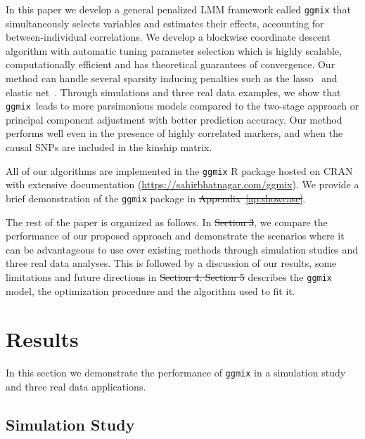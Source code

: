 \documentclass[10pt,letterpaper]{article}
\newcommand{\ggmix}{\texttt{ggmix}}
\providecommand{\DIFaddtex}[1]{{\protect\color{blue}\uwave{#1}}} %
\providecommand{\DIFdeltex}[1]{{\protect\color{red}\sout{#1}}}                      %
\providecommand{\DIFaddbegin}{} %
\providecommand{\DIFaddend}{} %
\providecommand{\DIFdelbegin}{} %
\providecommand{\DIFdelend}{} %
\providecommand{\DIFadd}[1]{\texorpdfstring{\DIFaddtex{#1}}{#1}} %
\providecommand{\DIFdel}[1]{\texorpdfstring{\DIFdeltex{#1}}{}} %
\newcommand{\DIFscaledelfig}{0.5}
\newlength{\DIFdelgraphicswidth} %
\newlength{\DIFdelgraphicsheight} %
\newcommand{\DIFaddincludegraphics}[2][]{{\color{blue}\fbox{\DIFOincludegraphics[#1]{#2}}}} %
\newcommand{\DIFdelincludegraphics}[2][]{%
\sbox{\DIFdelgraphicsbox}{\DIFOincludegraphics[#1]{#2}}%
\settoboxwidth{\DIFdelgraphicswidth}{\DIFdelgraphicsbox} %
\settoboxtotalheight{\DIFdelgraphicsheight}{\DIFdelgraphicsbox} %
\scalebox{\DIFscaledelfig}{%
\parbox[b]{\DIFdelgraphicswidth}{\usebox{\DIFdelgraphicsbox}\\[-\baselineskip] \rule{\DIFdelgraphicswidth}{0em}}\llap{\resizebox{\DIFdelgraphicswidth}{\DIFdelgraphicsheight}{%
\setlength{\unitlength}{\DIFdelgraphicswidth}%
\begin{picture}(1,1)%
\thicklines\linethickness{2pt} %
{\color[rgb]{1,0,0}\put(0,0){\framebox(1,1){}}}%
{\color[rgb]{1,0,0}\put(0,0){\line( 1,1){1}}}%
{\color[rgb]{1,0,0}\put(0,1){\line(1,-1){1}}}%
\end{picture}%
}\hspace*{3pt}}} %
} %
\DeclareRobustCommand{\DIFaddbegin}{\DIFOaddbegin \let\includegraphics\DIFaddincludegraphics} %
\DeclareRobustCommand{\DIFaddend}{\DIFOaddend \let\includegraphics\DIFOincludegraphics} %
\DeclareRobustCommand{\DIFdelbegin}{\DIFOdelbegin \let\includegraphics\DIFdelincludegraphics} %
\DeclareRobustCommand{\DIFdelend}{\DIFOaddend \let\includegraphics\DIFOincludegraphics} %
\begin{document}
In this paper we develop a general penalized LMM framework called \texttt{ggmix} that simultaneously selects variables and estimates their effects, accounting for between-individual correlations. We develop a blockwise coordinate descent algorithm with automatic tuning parameter selection which is highly scalable, computationally efficient and has theoretical guarantees of convergence. Our method can handle several sparsity inducing penalties such as the lasso~\cite{tibshirani1996regression} and elastic net~\cite{zou2005regularization}. Through simulations and three real data examples, we show that \ggmix ~leads to more parsimonious models compared to the two-stage approach or principal component adjustment with better prediction accuracy. Our method performs well even in the presence of highly correlated markers, and when the causal SNPs are included in the kinship matrix. 

All of our algorithms are implemented in the \texttt{ggmix} R package hosted on CRAN with extensive documentation (\url{https://sahirbhatnagar.com/ggmix}). We provide a brief demonstration of the \texttt{ggmix} package in \DIFdelbegin \DIFdel{Appendix~\ref{ap:showcase}}\DIFdelend \DIFaddbegin {}\DIFaddend .

The rest of the paper is organized as follows. In \DIFdelbegin \DIFdel{Section 3}\DIFdelend \DIFaddbegin {}\DIFaddend , we compare the performance of our proposed approach and demonstrate the scenarios where it can be advantageous to use over existing methods through simulation studies and three real data analyses. This is followed by a discussion of our results, some limitations and future directions in \DIFdelbegin \DIFdel{Section 4. Section 5 }\DIFdelend \DIFaddbegin {}\DIFadd{. } \DIFaddend describes the \texttt{ggmix} model, the optimization procedure and the algorithm used to fit it.




\section*{Results}\label{sec:results}

In this section we demonstrate the performance of \texttt{ggmix} in a simulation study and three real data applications. 

\subsection*{Simulation Study} \label{simustudy}
\end{document}
